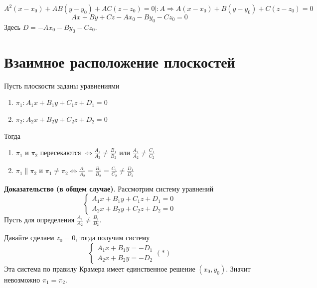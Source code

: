 \documentclass[a4paper]{article}
\begin{document}
{\begin{small}
\begin{enumerate}
\begin{enumerate}
\begin{equation}
A^2(x-x_0) + AB(y-y_0)+AC(z-z_0) = 0|:A \Rightarrow A(x-x_0) + B(y-y_0)+C(z-z_0) = 0 
\end{equation}
\begin{equation}
Ax+By+Cz - Ax_0 - By_0 -Cz_0 = 0
\end{equation}
Здесь $D = - Ax_0 - By_0 -Cz_0$.

\end{enumerate}
\end{enumerate}

\section*{Взаимное расположение плоскостей}
Пусть плоскости заданы уравнениями \begin{enumerate}
\item $\pi_1: A_1x+B_1y+C_1z+D_1 = 0$
\item $\pi_2: A_2x+B_2y+C_2z+D_2 = 0$
\end{enumerate}

Тогда\begin{enumerate}
\item $\pi_1$ и $\pi_2$ пересекаются $\displaystyle \Leftrightarrow \frac{A_1}{A_2} \neq \frac{B_1}{B_2}$ или $\displaystyle \frac{A_1}{A_2} \neq \frac{C_1}{C_2}$

\item $\pi_1 \parallel \pi_2$ и $\pi_1 \neq \pi_2 \Leftrightarrow \displaystyle \frac{A_1}{A_2} = \frac{B_1}{B_2} = \frac{C_1}{C_2} \neq \frac{D_1}{D_2}$
\end{enumerate}

\textbf{Доказательство (в общем случае)}. Рассмотрим систему уравнений
\begin{equation}
\begin{cases}
   A_1x+B_1y+C_1z+D_1 = 0
   \\
   A_2x+B_2y+C_2z+D_2 = 0
 \end{cases}
\end{equation}
Пусть для определения $\displaystyle \frac{A_1}{A_2} \neq \frac{B_1}{B_2}$.

Давайте сделаем $z_0=0$, тогда получим систему \begin{equation}
\begin{cases}
   A_1x+B_1y = -D_1
   \\
   A_2x+B_2y= -D_2
 \end{cases} (*)
\end{equation}
Эта система по правилу Крамера имеет единственное решение $(x_0, y_0)$. Значит невозможно $\pi_1 = \pi_2$.


\end{small}}
\end{document}
